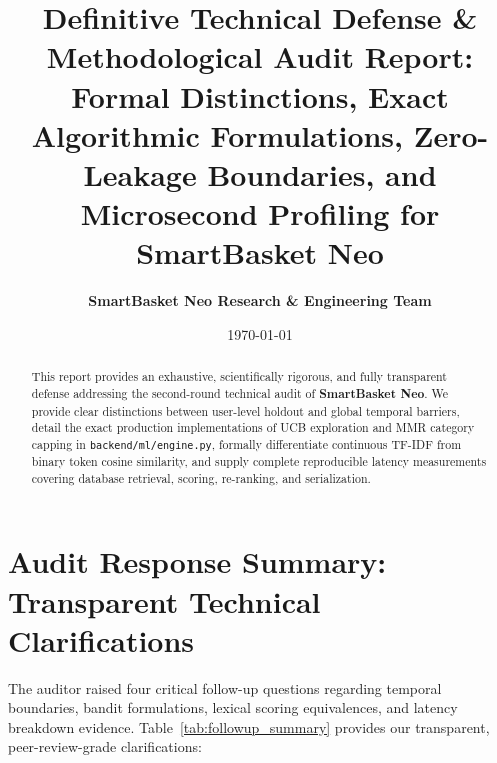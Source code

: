 \documentclass[11pt,a4paper]{article}
\title{\textbf{Definitive Technical Defense \& Methodological Audit Report:}\\
\large Formal Distinctions, Exact Algorithmic Formulations, Zero-Leakage Boundaries, and Microsecond Profiling for SmartBasket Neo}
\author{\textbf{SmartBasket Neo Research \& Engineering Team}}
\date{\today}
\begin{document}
\maketitle

\begin{abstract}
This report provides an exhaustive, scientifically rigorous, and fully transparent defense addressing the second-round technical audit of \textbf{SmartBasket Neo}. We provide clear distinctions between user-level holdout and global temporal barriers, detail the exact production implementations of UCB exploration and MMR category capping in \texttt{backend/ml/engine.py}, formally differentiate continuous TF-IDF from binary token cosine similarity, and supply complete reproducible latency measurements covering database retrieval, scoring, re-ranking, and serialization.
\end{abstract}

\tableofcontents
\newpage

\section{Audit Response Summary: Transparent Technical Clarifications}

The auditor raised four critical follow-up questions regarding temporal boundaries, bandit formulations, lexical scoring equivalences, and latency breakdown evidence. Table~\ref{tab:followup_summary} provides our transparent, peer-review-grade clarifications:
\end{document}
